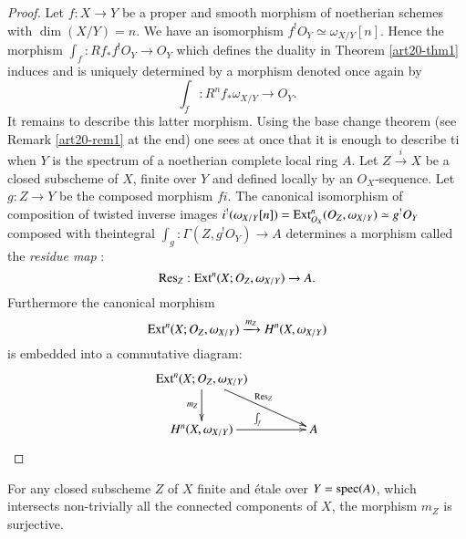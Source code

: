 \begin{proof}
Let $f:X\to Y$ be a proper and smooth morphism of noetherian schemes with $\dim(X/Y)=n$. We have an isomorphism $f^{!}O_{Y}\simeq \omega_{X/Y}[n]$. Hence the morphism $\int_{f}:Rf_{*}f^{!}O_{Y}\to O_{Y}$ which defines the duality in Theorem \ref{art20-thm1} induces and is uniquely determined by a morphism denoted once again by
$$
\int_{f}:R^{n}f_{*}\omega_{X/Y}\to O_{Y}.
$$
It remains to describe this latter morphism. Using the base change theorem (see Remark \ref{art20-rem1} at the end) one sees at once that it is enough to describe ti when $Y$ is the spectrum of a noetherian complete local ring $A$. Let $Z\xrightarrow{i}X$ be a closed subscheme of $X$, finite over $Y$ and defined locally by an $O_{X}$-sequence. Let $g:Z\to Y$ be the composed morphism $fi$. The canonical isomorphism of composition of twisted inverse images $i^{!}(\omega_{X/Y}[n])=\operatorname{\mathrm{Ext}}_{O_{X}}^{n}(O_{Z},\omega_{X/Y})\simeq g^{!}O_{Y}$ composed with the\pageoriginale integral $\int_{g}:\Gamma(Z,g^{!}O_{Y})\to A$ determines a morphism called the {\em residue map} :
$$
\operatorname{\mathrm{Res}}_{Z}:\operatorname{\mathrm{Ext}}^{n}(X;O_{Z},\omega_{X/Y})\to A.
$$
Furthermore the canonical morphism
$$
\operatorname{\mathrm{Ext}}^{n}(X;O_{Z},\omega_{X/Y})\xrightarrow{m_{Z}}H^{n}(X,\omega_{X/Y})
$$
is embedded into a commutative diagram:
\[
\xymatrix@C=1.5cm{
\Ext^{n}(X;O_{Z},\omega_{X/Y})\ar[d]_-{m_{Z}}\ar[dr]^{\Res_{Z}} & \\
H^{n}(X,\omega_{X/Y})\ar[r]^{\int_{f}} & A
}
\]
\end{proof}

\begin{proposition}\label{art20-prop2}
For any closed subscheme $Z$ of $X$ finite and \'etale over $Y=\operatorname{\mathrm{spec}} (A)$, which intersects non-trivially all the connected components of $X$, the morphism $m_{Z}$ is surjective.
\end{proposition}

